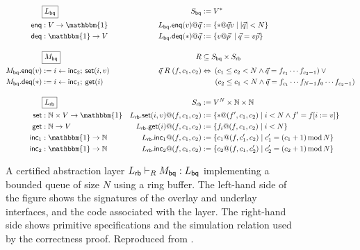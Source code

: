\documentclass[acmsmall,review,anonymous]{acmart}\settopmatter{printfolios=true,printccs=false,printacmref=false}
\begin{document}
\begin{figure*} %
  \begin{minipage}{.9\textwidth}
    \begin{align*}
      & \fbox{$L_\kw{bq}$} &
        S_\kw{bq} &:= V^* \\
      \kw{enq} &: V \rightarrow \mathbbm{1} &
        L_\kw{bq}.\kw{enq}(v)@\vec{q} &:= \{ * @ \vec{q} v \mid |\vec{q}| < N \} \\
      \kw{deq} &: \mathbbm{1} \rightarrow V &
        L_\kw{bq}.\kw{deq}(*)@\vec{q} &:= \{ v @ \vec{p} \: \mid \vec{q} = v \vec{p} \}
      \\[1em]
      & \fbox{$M_\kw{bq}$} &
        R &\subseteq S_\kw{bq} \times S_\kw{rb} \\
      M_\kw{bq}.\kw{enq}(v) &:= i \leftarrow \kw{inc}_2 ; \: \kw{set}(i, v) &
        \vec{q} \mathrel{R} (f, c_1, c_2) &\Leftrightarrow
        \: (c_1 \le c_2 < N \wedge
            \vec{q} = f_{c_1} \cdots f_{c_2-1}) \vee {}
      \\
      M_\kw{bq}.\kw{deq}(*) &:= i \leftarrow \kw{inc}_1 ; \: \kw{get}(i) &
        & \qquad \! (c_2 \le c_1 < N \wedge
            \vec{q} = f_{c_1} \cdots f_{N-1} f_0 \cdots f_{c_2 - 1})
      \\[1em]
      & \fbox{$L_\kw{rb}$} &
        S_\kw{rb} &:= V^N \times \mathbb{N} \times \mathbb{N}
      \\
      \kw{set} &: \mathbb{N} \times V \rightarrow \mathbbm{1} &
        L_\kw{rb}.\kw{set}(i, v)@(f, c_1, c_2) &:=
        \{ *@(f', c_1, c_2) \mid i < N \wedge f' = f[i := v] \}
      \\
      \kw{get} &: \mathbb{N} \rightarrow V &
        L_\kw{rb}.\kw{get}(i)@(f, c_1, c_2) &:=
        \{ f_i@(f, c_1, c_2) \mid i < N \}
      \\
      \kw{inc}_1 &: \mathbbm{1} \rightarrow \mathbb{N} &
        L_\kw{rb}.\kw{inc}_1@(f, c_1, c_2) &:=
        \{ c_1@(f, c_1', c_2) \mid
           c_1' = (c_1 + 1) \mathop{\mathrm{mod}} N \}
      \\
      \kw{inc}_2 &: \mathbbm{1} \rightarrow \mathbb{N} &
        L_\kw{rb}.\kw{inc}_2@(f, c_1, c_2) &:=
        \{ c_2@(f, c_1, c_2') \mid
           c_2' = (c_2 + 1) \mathop{\mathrm{mod}} N \}
    \end{align*}
  \end{minipage}
  \caption{
    A certified abstraction layer
    $L_{ \mathsf{rb} } \vdash_R M_{ \mathsf{bq} } : L_{ \mathsf{bq} }$
    implementing a bounded queue of size $N$
    using a ring buffer.
    The left-hand side of the figure shows
    the signatures of the overlay and underlay interfaces,
    and the code associated with the layer.
    The right-hand side shows primitive specifications
    and the simulation relation used by the correctness proof.
    Reproduced from \citet{rbgs-cal}.}
  \label{fig:cal}
\end{figure*}
\end{document}

